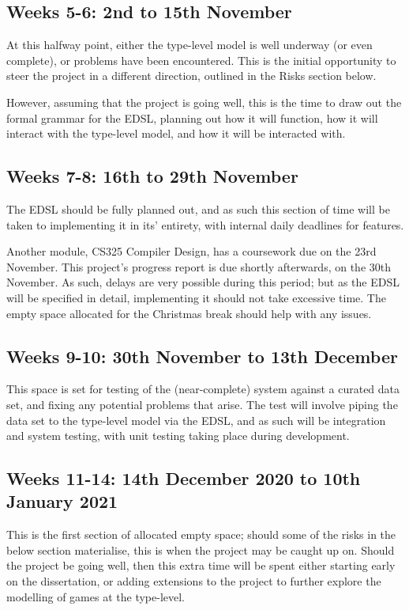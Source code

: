 \documentclass[12pt, a4paper]{scrartcl}
\begin{document}
\subsection{Weeks 5-6: 2nd to 15th November}

At this halfway point, either the type-level model is well underway (or even complete), or problems have been encountered. This is the initial opportunity to steer the project in a different direction, outlined in the Risks section below.

However, assuming that the project is going well, this is the time to draw out the formal grammar for the EDSL, planning out how it will function, how it will interact with the type-level model, and how it will be interacted with.

\subsection{Weeks 7-8: 16th to 29th November}

The EDSL should be fully planned out, and as such this section of time will be taken to implementing it in its' entirety, with internal daily deadlines for features.

Another module, CS325 Compiler Design, has a coursework due on the 23rd November. This project's progress report is due shortly afterwards, on the 30th November. As such, delays are very possible during this period; but as the EDSL will be specified in detail, implementing it should not take excessive time. The empty space allocated for the Christmas break should help with any issues.

\subsection{Weeks 9-10: 30th November to 13th December}

This space is set for testing of the (near-complete) system against a curated data set, and fixing any potential problems that arise. The test will involve piping the data set to the type-level model via the EDSL, and as such will be integration and system testing, with unit testing taking place during development.

\subsection{Weeks 11-14: 14th December 2020 to 10th January 2021}

This is the first section of allocated empty space; should some of the risks in the below section materialise, this is when the project may be caught up on. Should the project be going well, then this extra time will be spent either starting early on the dissertation, or adding extensions to the project to further explore the modelling of games at the type-level.
\end{document}
